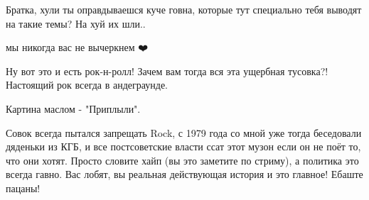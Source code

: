 \begin{itemize}
 
Братка, хули ты оправдываешся куче говна, которые тут специально тебя выводят на такие темы? На хуй их шли..

 
мы никогда вас не вычеркнем ❤️

 
Ну вот это и есть рок-н-ролл! Зачем вам тогда вся эта ущербная тусовка?! Настоящий рок всегда в андеграунде.

 
Картина маслом - "Приплыли".

 

Совок всегда пытался запрещать Rock, с 1979 года со мной уже тогда беседовали
дяденьки из КГБ, и все постсоветские власти ссат этот музон если он не поёт то,
что они хотят. Просто словите хайп (вы это заметите по стриму), а политика это
всегда гавно. Вас лобят, вы реальная действующая история и это главное! Ебаште
пацаны!


 

\end{itemize}
